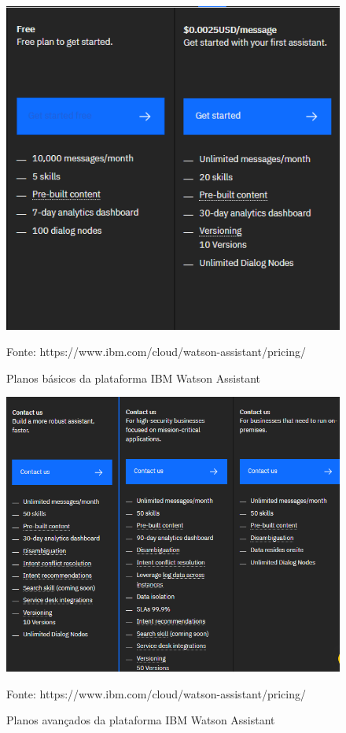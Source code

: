 \begin{figure}[H]
  \caption{Planos básicos da plataforma IBM Watson Assistant}

  \centering
  \includegraphics[scale=0.5]{Imagens/ibm-basic.png} 
 
  \label{fig:basico}
  
  Fonte: https://www.ibm.com/cloud/watson-assistant/pricing/
\end{figure}



\begin{figure}[H]
  \caption{Planos avançados da plataforma IBM Watson Assistant}

  \centering
  \includegraphics[scale=0.5]{Imagens/ibm-other.png} 
 
  \label{fig:avancado}
    Fonte: https://www.ibm.com/cloud/watson-assistant/pricing/
\end{figure}



